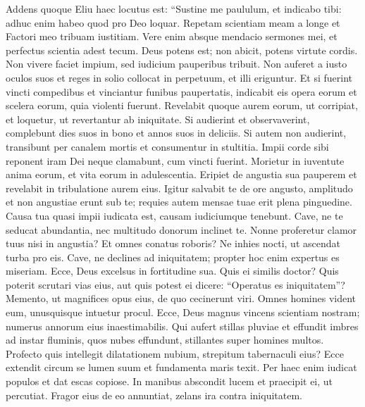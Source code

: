 \begin{biblechapter}  
\verse Addens quoque Eliu haec locutus est: 
\verse “Sustine me paululum, et indicabo tibi: adhuc enim habeo quod pro Deo loquar. 
\verse Repetam scientiam meam a longe et Factori meo tribuam iustitiam. 
\verse Vere enim absque mendacio sermones mei, et perfectus scientia adest tecum. 
\verse Deus potens est; non abicit, potens virtute cordis. 
\verse Non vivere faciet impium, sed iudicium pauperibus tribuit. 
\verse Non auferet a iusto oculos suos et reges in solio collocat in perpetuum, et illi eriguntur. 
\verse Et si fuerint vincti compedibus et vinciantur funibus paupertatis, 
\verse indicabit eis opera eorum et scelera eorum, quia violenti fuerunt. 
\verse Revelabit quoque aurem eorum, ut corripiat, et loquetur, ut revertantur ab iniquitate. 
\verse Si audierint et observaverint, complebunt dies suos in bono et annos suos in deliciis. 
\verse Si autem non audierint, transibunt per canalem mortis et consumentur in stultitia. 
\verse Impii corde sibi reponent iram Dei neque clamabunt, cum vincti fuerint. 
\verse Morietur in iuventute anima eorum, et vita eorum in adulescentia. 
\verse Eripiet de angustia sua pauperem et revelabit in tribulatione aurem eius. 
\verse Igitur salvabit te de ore angusto, amplitudo et non angustiae erunt sub te; requies autem mensae tuae erit plena pinguedine. 
\verse Causa tua quasi impii iudicata est, causam iudiciumque tenebunt. 
\verse Cave, ne te seducat abundantia, nec multitudo donorum inclinet te. 
\verse Nonne proferetur clamor tuus nisi in angustia? Et omnes conatus roboris? 
\verse Ne inhies nocti, ut ascendat turba pro eis. 
\verse Cave, ne declines ad iniquitatem; propter hoc enim expertus es miseriam. 
\verse Ecce, Deus excelsus in fortitudine sua. Quis ei similis doctor? 
\verse Quis poterit scrutari vias eius, aut quis potest ei dicere: “Operatus es iniquitatem”? 
\verse Memento, ut magnifices opus eius, de quo cecinerunt viri. 
\verse Omnes homines vident eum, unusquisque intuetur procul. 
\verse Ecce, Deus magnus vincens scientiam nostram; numerus annorum eius inaestimabilis. 
\verse Qui aufert stillas pluviae et effundit imbres ad instar fluminis, 
\verse quos nubes effundunt, stillantes super homines multos. 
\verse Profecto quis intellegit dilatationem nubium, strepitum tabernaculi eius? 
\verse Ecce extendit circum se lumen suum et fundamenta maris texit. 
\verse Per haec enim iudicat populos et dat escas copiose. 
\verse In manibus abscondit lucem et praecipit ei, ut percutiat. 
\verse Fragor eius de eo annuntiat, zelans ira contra iniquitatem. 
\end{biblechapter}


